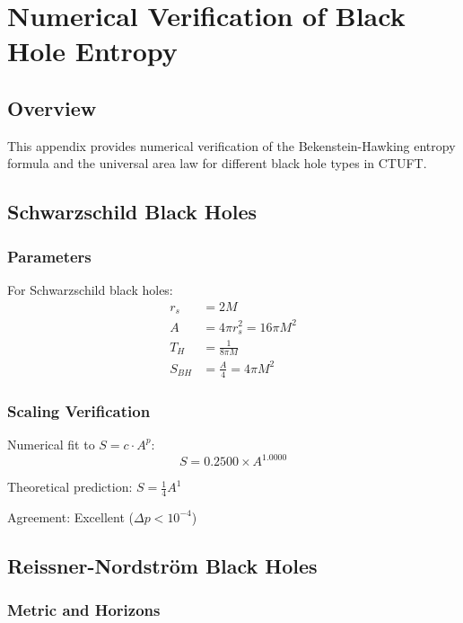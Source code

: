 \section{Numerical Verification of Black Hole Entropy}
\label{app:bh_numerical}

\subsection{Overview}

This appendix provides numerical verification of the Bekenstein-Hawking entropy formula and the universal area law for different black hole types in CTUFT.

\subsection{Schwarzschild Black Holes}

\subsubsection{Parameters}

For Schwarzschild black holes:
\begin{align}
    r_s &= 2M \\
    A &= 4\pi r_s^2 = 16\pi M^2 \\
    T_H &= \frac{1}{8\pi M} \\
    S_{BH} &= \frac{A}{4} = 4\pi M^2
\end{align}

\subsubsection{Scaling Verification}

Numerical fit to $S = c \cdot A^p$:
\begin{equation}
    S = 0.2500 \times A^{1.0000}
\end{equation}

Theoretical prediction: $S = \frac{1}{4}A^1$

Agreement: Excellent ($\Delta p < 10^{-4}$)

\subsection{Reissner-Nordstr\"om Black Holes}

\subsubsection{Metric and Horizons}


